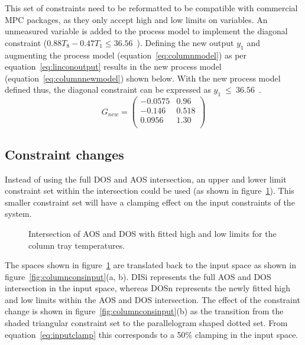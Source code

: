 \documentclass[final,authoryear,5pt,times,twocolumn]{elsarticle}
\newcommand{\bpm}{\begin{pmatrix}} %
\newcommand{\epm}{\end{pmatrix}}
\begin{document}
This set of constraints need to be reformatted to be compatible with commercial MPC packages, as they only accept high and low limits on variables.
An unmeasured variable is added to the process model to implement the diagonal constraint ($0.88T_8-0.47T_1\leq 36.56$~\textcelsius).
Defining the new output $y_1$ and augmenting the process model (equation~\ref{eq:columnmodel}) as per equation~\ref{eq:linconoutput} results in the new process model (equation~\ref{eq:columnnewmodel}) shown below. With the new process model defined thus, the diagonal constraint can be expressed as {$y_1~\leq~36.56$~\textcelsius}.
\begin{equation}
  \label{eq:columnnewmodel}
  G_{new}= \bpm -0.0575 & 0.96 \\       %
                  -0.146  & 0.518 \\      %
                   0.0956 & 1.30 \\ \epm  %
\end{equation}


\subsection{Constraint changes}
Instead of using the full DOS and AOS intersection, an upper and lower limit constraint set within the intersection could be used (as shown in figure~\ref{fig:columnfitbox}).
This smaller constraint set will have a clamping effect on the input constraints of the system.

\begin{figure}[htbp]
  \centering
    \scalebox{1}{}
  \caption[Fitted constraints for the laboratory distillation column]{Intersection of AOS and DOS with fitted high and low limits for the column tray temperatures.}
  \label{fig:columnfitbox}
\end{figure}

The spaces shown in figure~\ref{fig:columnfitbox} are translated back to the input space as shown in figure~\ref{fig:columnconsinput}(a, b).
DISi represents the full AOS and DOS intersection in the input space, whereas DOSn represents the newly fitted high and low limits within the AOS and DOS intersection.
The effect of the constraint change is shown in figure~\ref{fig:columnconsinput}(b) as the transition from the shaded triangular constraint set to the parallelogram shaped dotted set.
From equation~\ref{eq:inputclamp} this corresponds to a 50\% clamping in the input space.
\end{document}
